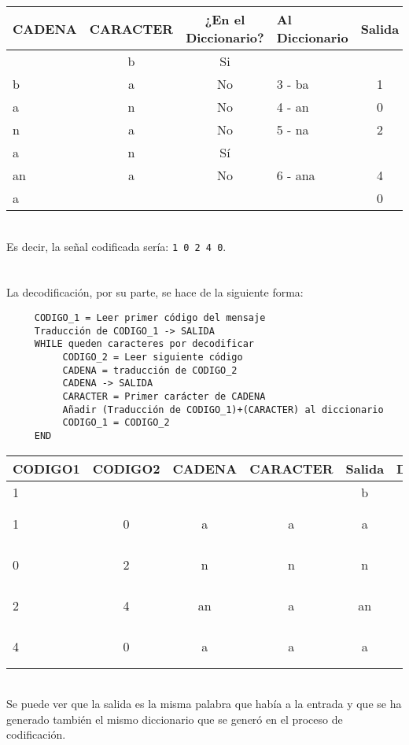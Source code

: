 \documentclass[es,apuntes]{uah}
\begin{document}
\begin{tabular}{lcclc}
CADENA & CARACTER  & ¿En el Diccionario? & Al Diccionario & Salida \\
\hline
 	& b & Si &  &  \\
 b & a & No & 3 - ba & 1 \\
 a & n & No & 4 - an & 0 \\
 n & a & No & 5 - na & 2 \\
 a & n & Sí & 		&  \\
 an & a & No & 6 - ana & 4 \\
 a & & & & 0 \\ 	
\end{tabular}

\ \\
Es decir, la señal codificada sería: \texttt{1 0 2 4 0}. \\

\ \\
\ \\

La decodificación, por su parte, se hace de la siguiente forma:

\begin{verbatim}
     CODIGO_1 = Leer primer código del mensaje
     Traducción de CODIGO_1 -> SALIDA
     WHILE queden caracteres por decodificar
          CODIGO_2 = Leer siguiente código
          CADENA = traducción de CODIGO_2
          CADENA -> SALIDA
          CARACTER = Primer carácter de CADENA
          Añadir (Traducción de CODIGO_1)+(CARACTER) al diccionario
          CODIGO_1 = CODIGO_2
     END
\end{verbatim}


\begin{tabular}{lccccc}
CODIGO1 & CODIGO2  & CADENA & CARACTER & Salida & Dicc.\\
\hline
1 &   &   &   & b &\\
1 & 0 & a & a & a & 3 - ba \\
0 & 2 & n & n & n & 4 - an \\
2 & 4 & an & a & an & 5 - na \\
4 & 0 & a & a & a & 6 - ana \\
\end{tabular}

\ \\
Se puede ver que la salida es la misma palabra que había a la entrada y que se ha generado también el mismo diccionario que se generó en el proceso de codificación. 

\end{document}
